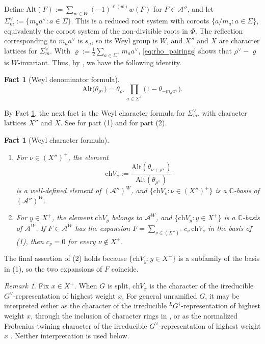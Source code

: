 \documentclass[12pt]{article}
\numberwithin{equation}{section}
\newtheorem{fact}[theorem]{Fact}
\theoremstyle{definition}
\theoremstyle{remark}
\newtheorem{remark}[theorem]{Remark}
\theoremstyle{plain}
\begin{document}
Define $\mathrm{Alt}(F) := \sum_{w\in W}(-1)^{\ell(w)}w(F)$ for $F \in \mathcal{A}''$, and let $\Sigma_m^\vee := \{m_a a^\vee : a \in \Sigma\}$. This is a reduced root system with coroots $\{a/m_a : a \in \Sigma\}$, equivalently the coroot system of the non-divisible roots in $\Phi$. The reflection corresponding to $m_a a^\vee$ is $s_a$, so its Weyl group is $W$, and $X''$ and $X$ are character lattices for $\Sigma_m^\vee$. With $\varrho := \tfrac12\sum_{a\in\Sigma^+}m_a a^\vee$, \eqref{eq:rho_pairings} shows that $\rho^\vee-\varrho$ is $W$-invariant. Thus, by \cite[Chapter VI, \S 3, no.~3, Proposition~2(i)]{Bou}, we have the following identity.

\begin{fact}[Weyl denominator formula]\label{fact:denominator}
$$\mathrm{Alt}\big(\theta_{\rho^\vee}\big) = \theta_{\rho^\vee}\prod_{a\in\Sigma^+}\big(1 - \theta_{-m_a a^\vee}\big).$$
\end{fact}

By Fact \ref{fact:denominator}, the next fact is the Weyl character formula for $\Sigma_m^\vee$, with character lattices $X''$ and $X$. See \cite[Chapter VI, \S 3, no.~3, Propositions~1 and~2(ii)--(iii)]{Bou} for part (1) and \cite[Chapter VI, \S 3, no.~3, Remark~2, and no.~4, Proposition~3]{Bou} for part (2).

\begin{fact}[Weyl character formula]\label{fact:chV}
\begin{enumerate}
\item For $\nu \in (X'')^+$, the element
\[ \mathrm{ch}V_\nu := \frac{\mathrm{Alt}(\theta_{\nu+\rho^\vee})}{\mathrm{Alt}(\theta_{\rho^\vee})} \]
is a well-defined element of $(\mathcal{A}'')^W$, and $\{\mathrm{ch}V_\nu : \nu \in (X'')^+\}$ is a $\mathbb{C}$-basis of $(\mathcal{A}'')^W$.
\item For $y \in X^+$, the element $\mathrm{ch}V_y$ belongs to $\mathcal{A}^W$, and $\{\mathrm{ch}V_y : y \in X^+\}$ is a $\mathbb{C}$-basis of $\mathcal{A}^W$. If $F\in\mathcal{A}^W$ has the expansion $F=\sum_{\nu\in(X'')^+}c_\nu\,\mathrm{ch}V_\nu$ in the basis of (1), then $c_\nu=0$ for every $\nu\notin X^+$.
\end{enumerate}
\end{fact}

The final assertion of (2) holds because $\{\mathrm{ch}V_y : y\in X^+\}$ is a subfamily of the basis in (1), so the two expansions of $F$ coincide.

\begin{remark}\label{rem:chV_interpretation}
Fix $x\in X^+$. When $G$ is split, $\mathrm{ch}V_x$ is the character of the irreducible $G^\vee$-representation of highest weight $x$. For general unramified $G$, it may be interpreted either as the character of the irreducible ${}^{L}G^\dagger$-representation of highest weight $x$, through the inclusion of character rings in \cite[Section 2.9 and Lemma 2.11]{GK22}, or as the normalized Frobenius-twining character of the irreducible $G^\vee$-representation of highest weight $x$ \cite[Theorem 7.4]{Hopper}. Neither interpretation is used below.
\end{remark}
\end{document}

